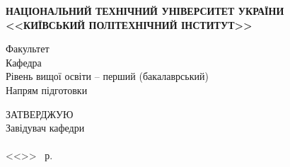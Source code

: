 \documentclass[main.tex]{subfiles}
\begin{document}

\newcommand\ufullline{\uline{\hfill\mbox{}}}
\newcommand\fillinline{\uline{\hfill\mbox{}}}

\begin{specialpage}
  \MakeUppercase{\textbf{національний технічний університет України}}\\
  \MakeUppercase{\textbf{<<Київський Політехнічний Інститут>>}}\\
  \begin{flushleft}
    Факультет \ufullline\\
    Кафедра \ufullline\\
    Рівень вищої освіти -- перший (бакалаврський)\\
    Напрям підготовки \uline{\hfill\mbox{}}
  \end{flushleft}

  \vspace{1cm}

  \hfill\begin{minipage}{0.35\linewidth}
  \begin{flushleft}
      ЗАТВЕРДЖУЮ\\
      Завідувач кафедри\\
      \fillin[(підпис)]{\hspace{2.2cm}} \\
      <<\fillin{\phantom{99}}>>\fillin{\hspace{3cm}} ~р.
  \end{flushleft}
  \end{minipage}

  \vspace{1cm}


\end{specialpage}
\end{document}
